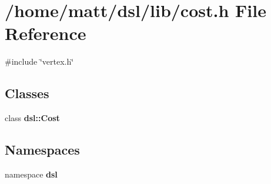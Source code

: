 \section{/home/matt/dsl/lib/cost.h \-File \-Reference}
\label{cost_8h}
{\ttfamily \#include \char`\"{}vertex.\-h\char`\"{}}\*
\subsection*{\-Classes}
\begin{DoxyCompactItemize}
\item 
class {\bf dsl\-::\-Cost}
\end{DoxyCompactItemize}
\subsection*{\-Namespaces}
\begin{DoxyCompactItemize}
\item 
namespace {\bf dsl}
\end{DoxyCompactItemize}

